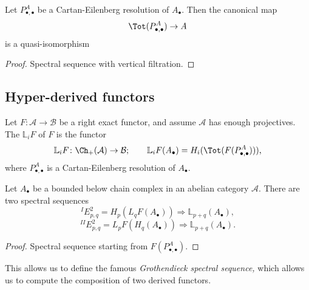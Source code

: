 \documentclass[main.tex]{subfiles}
\begin{document}
\begin{proposition}
  Let $P^{A}_{\bullet,\bullet}$ be a Cartan-Eilenberg resolution of $A_{\bullet}$. Then the canonical map
  \begin{equation*}
    \Tot(P^{A}_{\bullet,\bullet}) \to A
  \end{equation*}
  is a quasi-isomorphism
\end{proposition}
\begin{proof}
  Spectral sequence with vertical filtration.
\end{proof}

\subsection{Hyper-derived functors}
\label{ssc:hyper_derived_functors}

\begin{definition}
  \label{def:left_hyper_derived_functor}
  Let $F\colon \mathcal{A} \to \mathcal{B}$ be a right exact functor, and assume $\mathcal{A}$ has enough projectives. The  $\mathbb{L}_{i}F$ of $F$ is the functor
  \begin{equation*}
    \mathbb{L}_{i}F\colon \Ch_{+}(\mathcal{A}) \to \mathcal{B};\qquad \mathbb{L}_{i}F(A_{\bullet}) = H_{i}(\Tot(F(P^{A}_{\bullet, \bullet}))),
  \end{equation*}
  where $P^{A}_{\bullet, \bullet}$ is a Cartan-Eilenberg resolution of $A_{\bullet}$.
\end{definition}

\begin{proposition}
  \label{prop:horizontal_and_vertical_filtration}
  Let $A_{\bullet}$ be a bounded below chain complex in an abelian category $\mathcal{A}$. There are two spectral sequences
  \begin{equation*}
    ^{I}E^{2}_{p,q} = H_{p}(L_{q}F(A_{\bullet})) \Longrightarrow \mathbb{L}_{p+q}(A_{\bullet}),
  \end{equation*}
  \begin{equation*}
    ^{II}E^{2}_{p,q} = L_{p}F(H_{q}(A_{\bullet})) \Longrightarrow \mathbb{L}_{p+q}(A_{\bullet}).
  \end{equation*}
\end{proposition}
\begin{proof}
  Spectral sequence starting from $F(P^{A}_{\bullet,\bullet})$.
\end{proof}

This allows us to define the famous \emph{Grothendieck spectral sequence,} which allows us to compute the composition of two derived functors.
\end{document}
